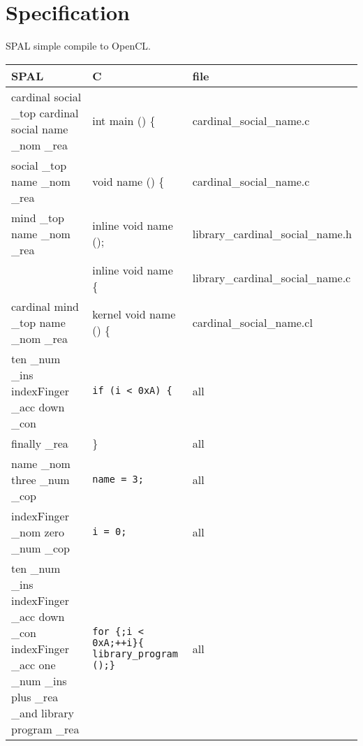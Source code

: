 \chapter{Specification}
SPAL simple compile to OpenCL.\@

\begin{sidewaystable}
\begin{tabulary}{\textwidth}{L|L|L}
SPAL & C & file \\
\midrule 
\midrule 
cardinal social \_top cardinal social name \_nom \_rea & int main () \{ & 
cardinal\_social\_name.c \\
\midrule
social \_top name \_nom \_rea & void name () \{ & cardinal\_social\_name.c \\
\midrule
mind \_top name \_nom \_rea & inline void name (); &
library\_cardinal\_social\_name.h \\
 & inline void name\(\) \{ & library\_cardinal\_social\_name.c \\
\midrule
cardinal mind \_top name \_nom \_rea & kernel void name () \{ &
cardinal\_social\_name.cl \\
\midrule
ten \_num \_ins indexFinger \_acc down \_con & \texttt{if (i < 0xA) \{} & all \\
\midrule 
finally \_rea & \} & all \\
\midrule
name \_nom three \_num \_cop & \texttt{name = 3;} & all \\
\midrule 
indexFinger \_nom zero \_num \_cop & \texttt{i = 0;} & all \\
\midrule 
ten \_num \_ins indexFinger \_acc down \_con 
indexFinger \_acc one \_num \_ins plus \_rea \_and library program \_rea & 
\texttt{for \{;i < 0xA;\@ ++i\}\{ library\_program ();\}} & all \\
\end{tabulary}
\end{sidewaystable}
